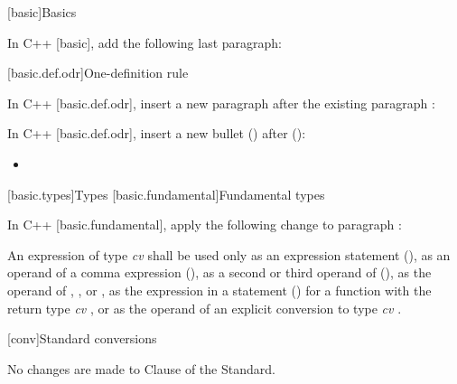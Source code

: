 
[basic]{Basics}

\pnum
In C++ [basic], add the following last paragraph:

\begin{std.txt}
\end{std.txt}



\setcounter{section}{1}
[basic.def.odr]{One-definition rule}

\pnum
In C++ [basic.def.odr], insert a new paragraph after the existing paragraph :

\begin{std.txt}
\end{std.txt}

\pnum
In C++ [basic.def.odr], insert a new bullet
() after
():
\begin{std.txt}
\begin{itemize}
\item {}
\end{itemize}
\end{std.txt}

\setcounter{section}{6}
[basic.types]{Types}
[basic.fundamental]{Fundamental types}

\pnum
In C++ [basic.fundamental], apply the following change to paragraph :

\begin{std.txt}
An expression of type \emph{cv}  shall be used only as an expression
statement (), as an operand of a comma expression
(), as a second or
third operand of  (), as the operand of ,
,  or , as the
expression in a  statement () for a function with the return type
\emph{cv} , or as the operand of an explicit conversion to type
\emph{cv} .
\end{std.txt}

[conv]{Standard conversions}

No changes are made to Clause \the\value{chapter} of the \Cpp Standard.
